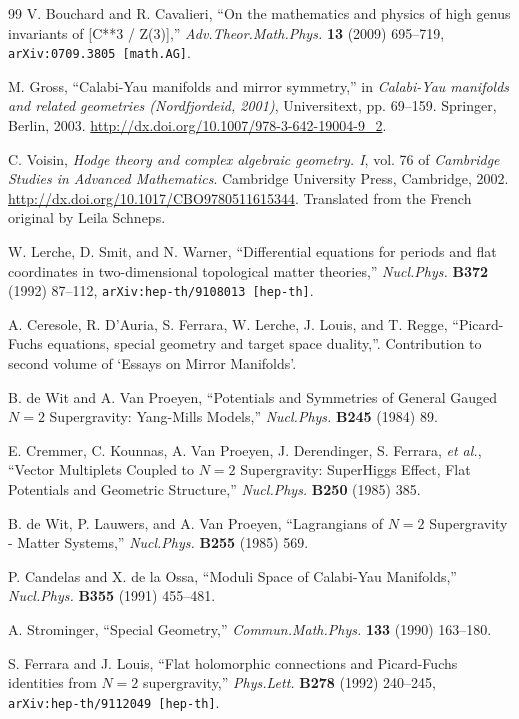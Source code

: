 \begin{thebibliography}{99}
V. Bouchard and R. Cavalieri, ``On the mathematics and physics of high genus invariants of
[C**3 / Z(3)],'' \textit{Adv.Theor.Math.Phys.} \textbf{13} (2009) 695--719,
\texttt{arXiv:0709.3805 [math.AG]}.

M. Gross, ``Calabi-Yau manifolds and mirror symmetry,'' in \textit{Calabi-Yau manifolds and
related geometries (Nordfjordeid, 2001)}, Universitext, pp. 69--159. Springer, Berlin,
2003. \url{http://dx.doi.org/10.1007/978-3-642-19004-9_2}.

C. Voisin, \textit{Hodge theory and complex algebraic geometry. I}, vol. 76 of
\textit{Cambridge Studies in Advanced Mathematics}. Cambridge University Press, Cambridge,
2002. \url{http://dx.doi.org/10.1017/CBO9780511615344}. Translated from the French original
by Leila Schneps.

W. Lerche, D. Smit, and N. Warner, ``Differential equations for periods and flat
coordinates in two-dimensional topological matter theories,'' \textit{Nucl.Phys.}
\textbf{B372} (1992) 87--112, \texttt{arXiv:hep-th/9108013 [hep-th]}.

A. Ceresole, R. D'Auria, S. Ferrara, W. Lerche, J. Louis, and T. Regge, ``Picard-Fuchs
equations, special geometry and target space duality,''. Contribution to second volume of
`Essays on Mirror Manifolds'.

B. de Wit and A. Van Proeyen, ``Potentials and Symmetries of General Gauged $N=2$
Supergravity: Yang-Mills Models,'' \textit{Nucl.Phys.} \textbf{B245} (1984) 89.


E. Cremmer, C. Kounnas, A. Van Proeyen, J. Derendinger, S. Ferrara, \textit{et al.},
``Vector Multiplets Coupled to $N=2$ Supergravity: SuperHiggs Effect, Flat Potentials and
Geometric Structure,'' \textit{Nucl.Phys.} \textbf{B250} (1985) 385.

B. de Wit, P. Lauwers, and A. Van Proeyen, ``Lagrangians of $N=2$ Supergravity - Matter
Systems,'' \textit{Nucl.Phys.} \textbf{B255} (1985) 569.

P. Candelas and X. de la Ossa, ``Moduli Space of Calabi-Yau Manifolds,'' \textit{Nucl.Phys.}
\textbf{B355} (1991) 455--481.

A. Strominger, ``Special Geometry,'' \textit{Commun.Math.Phys.} \textbf{133} (1990)
163--180.

S. Ferrara and J. Louis, ``Flat holomorphic connections and Picard-Fuchs identities from
$N=2$ supergravity,'' \textit{Phys.Lett.} \textbf{B278} (1992) 240--245,
\texttt{arXiv:hep-th/9112049 [hep-th]}.


\end{thebibliography}
